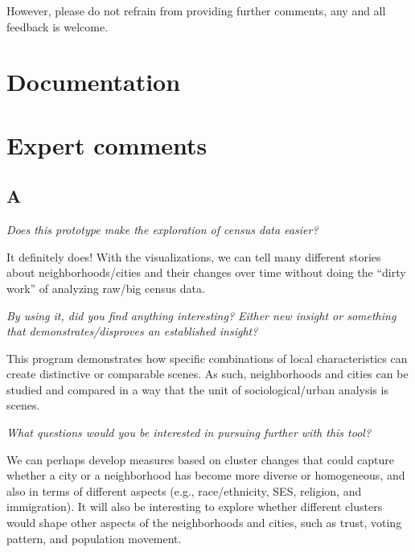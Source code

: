 \documentclass[a4paper]{article}
\newcommand{\question}[1]{\smallskip\noindent\emph{#1}}
\newcommand{\censure}[1]{}
\begin{document}
However, please do not refrain from providing further comments, any and all
feedback is welcome. 


\section{Documentation}



\section{Expert comments}

\subsection{A\censure{ - Cary Wu}}
\censure{\emph{Doctoral candidate in Sociology at the University of British Columbia, Canada.}}

\question{Does this prototype make the exploration of census data easier?}
 

It definitely does! With the visualizations, we can tell many different stories
about neighborhoods/cities and their changes over time without doing the “dirty
work” of analyzing raw/big census data.
 

 

\question{By using it, did you find anything interesting? Either new insight or
something that demonstrates/disproves an established insight? }
 

This program demonstrates how specific combinations of local characteristics can
create distinctive or comparable scenes. As such, neighborhoods and cities can
be studied and compared in a way that the unit of sociological/urban analysis is
scenes.
 
 
\question{What questions would you be interested in pursuing further with this tool?}
 

We can perhaps develop measures based on cluster changes that could capture
whether a city or a neighborhood has become more diverse or homogeneous, and
also in terms of different aspects (e.g., race/ethnicity, SES, religion, and
immigration). It will also be interesting to explore whether different clusters
would shape other aspects of the neighborhoods and cities, such as trust, voting
pattern, and population movement.
 
\end{document}
